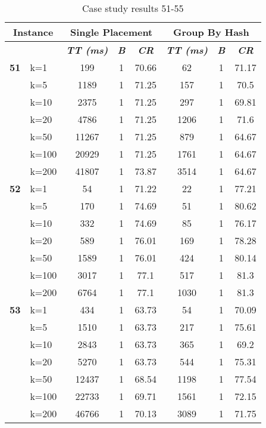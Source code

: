     \begin{table}[htbp]
    \caption{Case study results 51-55}
    \centering
    \begin{tabular}{|l|l|c|c|c|c|c|c|}
    \hline
    \multicolumn{ 2}{|c|}{\textbf{Instance}} & \multicolumn{ 3}{c|}{\textbf{Single Placement}} & \multicolumn{ 3}{c|}{\textbf{Group By Hash}} \\ \hline
    \multicolumn{ 2}{|l|}{} & \textbf{\textit{TT (ms)}} & \textbf{\textit{B}} & \textbf{\textit{CR}} & \textbf{\textit{TT (ms)}} & \textbf{\textit{B}} & \textbf{\textit{CR}} \\ \hline
    \multicolumn{1}{|r|}{\textbf{51}} & k=1 & 199 & 1 & 70.66 & 62 & 1 & 71.17 \\ 
     & k=5 & 1189 & 1 & 71.25 & 157 & 1 & 70.5 \\ 
     & k=10 & 2375 & 1 & 71.25 & 297 & 1 & 69.81 \\ 
     & k=20 & 4786 & 1 & 71.25 & 1206 & 1 & 71.6 \\ 
     & k=50 & 11267 & 1 & 71.25 & 879 & 1 & 64.67 \\ 
     & k=100 & 20929 & 1 & 71.25 & 1761 & 1 & 64.67 \\ 
     & k=200 & 41807 & 1 & 73.87 & 3514 & 1 & 64.67 \\ \hline
    \multicolumn{1}{|r|}{\textbf{52}} & k=1 & 54 & 1 & 71.22 & 22 & 1 & 77.21 \\ 
     & k=5 & 170 & 1 & 74.69 & 51 & 1 & 80.62 \\ 
     & k=10 & 332 & 1 & 74.69 & 85 & 1 & 76.17 \\ 
     & k=20 & 589 & 1 & 76.01 & 169 & 1 & 78.28 \\ 
     & k=50 & 1589 & 1 & 76.01 & 424 & 1 & 80.14 \\ 
     & k=100 & 3017 & 1 & 77.1 & 517 & 1 & 81.3 \\ 
     & k=200 & 6764 & 1 & 77.1 & 1030 & 1 & 81.3 \\ \hline
    \multicolumn{1}{|r|}{\textbf{53}} & k=1 & 434 & 1 & 63.73 & 54 & 1 & 70.09 \\ 
     & k=5 & 1510 & 1 & 63.73 & 217 & 1 & 75.61 \\ 
     & k=10 & 2843 & 1 & 63.73 & 365 & 1 & 69.2 \\ 
     & k=20 & 5270 & 1 & 63.73 & 544 & 1 & 75.31 \\ 
     & k=50 & 12437 & 1 & 68.54 & 1198 & 1 & 77.54 \\ 
     & k=100 & 22733 & 1 & 69.71 & 1561 & 1 & 72.15 \\ 
     & k=200 & 46766 & 1 & 70.13 & 3089 & 1 & 71.75 \\ \hline

\end{tabular}
\end{table}
